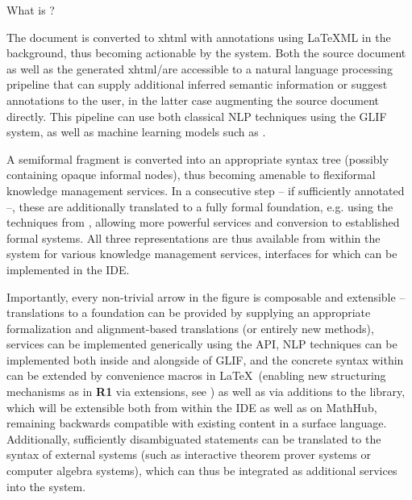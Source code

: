 \begin{omgroup}{What is \sTeX?}
{The document is converted to xhtml with \omdoc annotations
using \LaTeX ML in the background,
thus becoming actionable by the \mmt system. Both the source document
as well as the generated xhtml/\omdoc are accessible to a natural language
processing pripeline that can supply additional inferred semantic 
information or suggest annotations to the user, in the latter case 
augmenting the source document directly. This pipeline can use both 
classical NLP techniques using the GLIF system, as well as machine 
learning models such as \cite{own:fifom}.

A semiformal fragment is converted 
into an appropriate syntax tree (possibly containing opaque
informal nodes), 
thus becoming amenable
to flexiformal knowledge management services. In a consecutive step
-- if sufficiently annotated --, these are
additionally translated
to a fully formal foundation, e.g. using the techniques from 
\cite{DMueller:phd:19,own:translations}, allowing
more powerful services and conversion to established formal
systems. All three representations
are thus available from within the \mmt system for various
knowledge management services, interfaces for which can be
implemented in the IDE.

Importantly, every non-trivial arrow in the figure is 
composable and extensible -- 
translations to a foundation can be provided
by supplying an appropriate formalization and alignment-based
translations (or entirely new methods),
services can be implemented generically using the \mmt API,
NLP techniques can be implemented both inside and alongside of
GLIF, and the concrete syntax within \sTeX can be extended
by convenience macros in \LaTeX\ (enabling new
structuring mechanisms as in \textbf{R1} via 
\mmt extensions, see
\cite{MueRabRot:rslffml20}) as well as via additions to
the library, which will be extensible both from within the IDE
as well as on MathHub,
remaining backwards compatible with existing content in a surface 
language. Additionally, sufficiently disambiguated
statements can be translated to the syntax of 
external systems (such as interactive theorem prover systems
or computer algebra systems),
which can thus be integrated as additional services into the system.
}

\end{omgroup}

